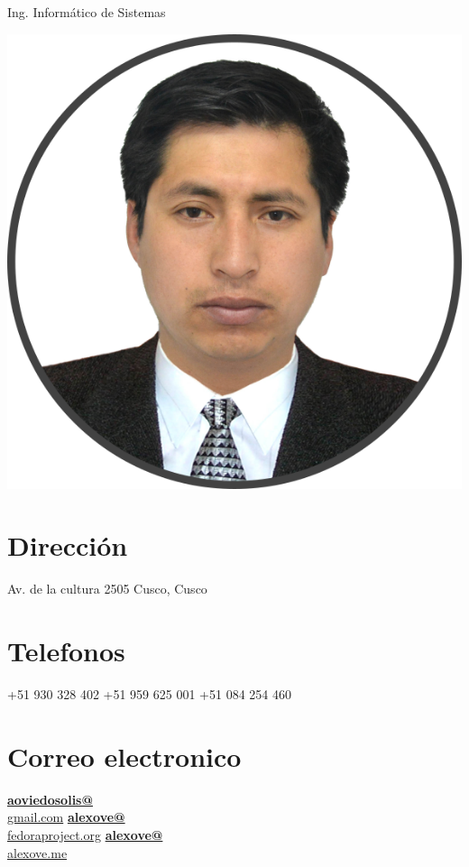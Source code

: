 \documentclass[]{friggeri-cv}
\begin{document}
{Ing. Inform\'atico de Sistemas}


\begin{aside}
    \includegraphics[scale=0.18]{img/aoviedo.png}
    \section{Direcci\'on}
    Av. de la cultura 2505
    Cusco, Cusco
    ~
    \section{Telefonos}
    +51 930 328 402
    +51 959 625 001
    +51 084 254 460
    ~
    \section{Correo electronico}
    \href{mailto:aoviedosolis@gmail.com}{\textbf{aoviedosolis@}\\gmail.com}
    \href{mailto:alexove@fedoraproject.org}{\textbf{alexove@}\\fedoraproject.org}
    \href{mailto:alexove@alexove.me}{\textbf{alexove@}\\alexove.me}
    ~

\end{aside}
\end{document}
